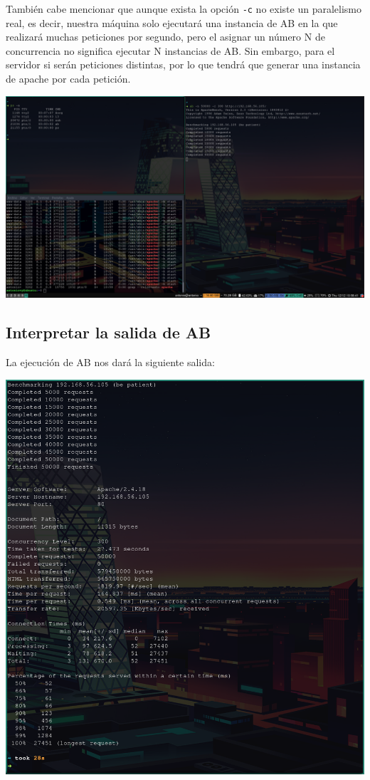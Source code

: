 \documentclass[12pt, spanish]{article}
\begin{document}
También cabe mencionar que aunque exista la opción \texttt{-c} no existe un paralelismo real, es decir, nuestra máquina solo ejecutará una instancia de AB en la que realizará muchas peticiones por segundo, pero el asignar un número N de concurrencia no significa ejecutar N instancias de AB. Sin embargo, para el servidor si serán peticiones distintas, por lo que tendrá que generar una instancia de apache por cada petición.

\begin{center}
\includegraphics[scale=0.25]{test-ab.png}
\end{center}

\newpage

\subsection{Interpretar la salida de AB}

La ejecución de AB nos dará la siguiente salida:


\begin{center}
\includegraphics[scale=0.45]{salida-ab.png}
\end{center}
\end{document}
